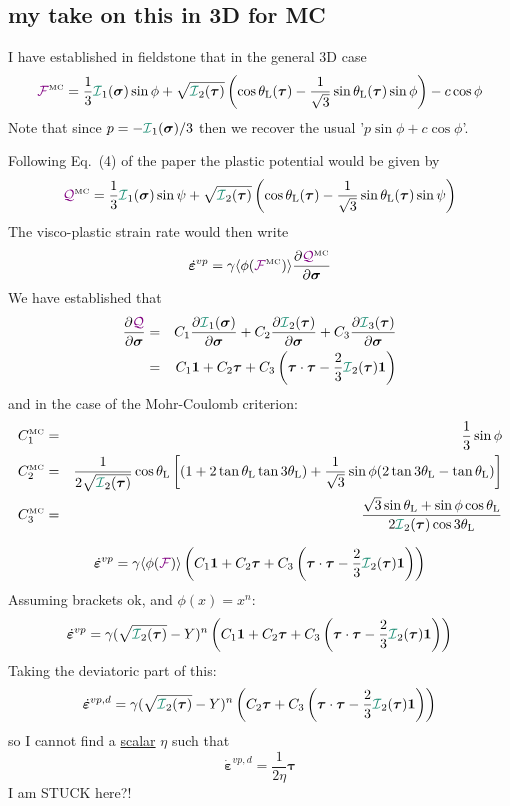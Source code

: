 \subsection{my take on this in 3D for MC}

I have established in fieldstone that in the general 3D case
\begin{equation}
\FFF^{\text{\tiny MC}}=\frac{1}{3} {\III}_1({\bm \sigma}) \sin \phi  + 
\sqrt{  {\III}_2({\bm \tau})  } \left( \cos \theta_{\rm L}(\bm\tau) - 
\frac{1}{\sqrt{3}} \sin \theta_{\rm L}(\bm\tau)  \sin \phi \right) - c \cos \phi
\end{equation}
Note that since $p=-{\III}_1(\bm\sigma)/3$ then we recover the usual '$p\sin\phi+c \cos\phi$'.

Following Eq.~(4) of the paper the plastic potential would be given by 
\[
\QQQ^{\text{\tiny MC}} 
=\frac{1}{3} {\III}_1({\bm \sigma}) \sin \psi  + 
\sqrt{  {\III}_2({\bm \tau})  } 
\left( \cos \theta_{\rm L}(\bm\tau) -\frac{1}{\sqrt{3}} \sin \theta_{\rm L}(\bm\tau) \sin \psi \right) 
\]
The visco-plastic strain rate would then write
\[
\dot{\bm\varepsilon}^{vp} = \gamma \langle \phi({\color{violet}\cal F}^{\text{\tiny MC}}) \rangle 
\frac{\partial {\color{violet}\cal Q}^{\text{\tiny MC}}}{\partial \bm\sigma}
\]
We have established that 
\begin{eqnarray}
\frac{\partial \QQQ}{\partial \bm\sigma}
&=& 
C_1  \frac{\partial {\III}_1(\bm\sigma)}{\partial \bm\sigma} 
+
C_2  \frac{\partial {\III}_2(\bm\tau)}{\partial \bm\sigma} 
+
C_3  \frac{\partial {\III}_3(\bm\tau)}{\partial \bm\sigma}\nn\\
&=& C_1 {\bm 1} + C_2  {\bm \tau} + C_3 \left( \bm\tau\cdot\bm\tau -\frac23 {\III}_2(\bm\tau){\bm 1} \right)
\end{eqnarray}
and in the case of the Mohr-Coulomb criterion:
\begin{eqnarray}
C_1^{\text{\tiny MC}} &=& \frac13 \sin\phi  \\ 
C_2^{\text{\tiny MC}} 
&=& 
\frac{1}{2 \sqrt{ {\III}_2(\bm\tau)}   }   
\cos \theta_{\rm L}
\left[
(1 +  2\tan \theta_{\rm L}   \tan 3\theta_{\rm L})
+\frac{1}{\sqrt{3}} \sin\phi
( 2\tan 3\theta_{\rm L} - \tan\theta_{\rm L})
\right]
\nn\\
C_3^{\text{\tiny MC}} 
&=& 
\frac{
\sqrt{3}\sin\theta_{\rm L}
+
 \sin \phi \cos \theta_{\rm L}
}{2 {\III}_2({\bm \tau}) \cos 3\theta_{\rm L}}
\end{eqnarray}



\[
\dot{\bm\varepsilon}^{vp} = \gamma \langle \phi(\FFF) \rangle 
\left(
C_1 {\bm 1} + C_2  {\bm \tau} + C_3 \left( \bm\tau\cdot\bm\tau -\frac23 {\III}_2(\bm\tau){\bm 1} \right)
\right)
\]
Assuming brackets ok, and $\phi(x)=x^n$:
\[
\dot{\bm\varepsilon}^{vp} = \gamma (\sqrt{{\III}_2(\bm\tau)} - Y)^n 
\left(
C_1 {\bm 1} + C_2  {\bm \tau} + C_3 \left( \bm\tau\cdot\bm\tau -\frac23 {\III}_2(\bm\tau){\bm 1} \right)
\right)
\]
Taking the deviatoric part of this:
\[
\dot{\bm\varepsilon}^{vp,d} 
= \gamma (\sqrt{{\III}_2(\bm\tau)} - Y)^n 
\left(
 C_2  {\bm \tau} + C_3 \left( \bm\tau\cdot\bm\tau -\frac23 {\III}_2(\bm\tau){\bm 1} \right)
\right)
\]
so I cannot find a \underline{scalar} $\eta$ such that 
\[
\dot{\bm\varepsilon}^{vp,d} 
=\frac{1}{2\eta} {\bm \tau}
\]
I am STUCK here?!



